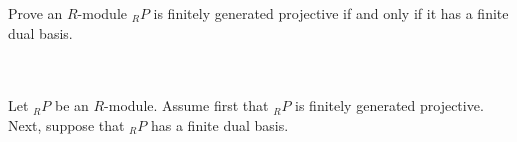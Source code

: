 Prove an $R$-module $_RP$ is finitely generated projective if and only if it has a finite dual basis.\\\\

\begin{solution}\renewcommand{\qedsymbol}{}\ \\
    Let $_RP$ be an $R$-module. Assume first that $_RP$ is finitely generated projective.\\
    Next, suppose that $_RP$ has a finite dual basis.
\end{solution}